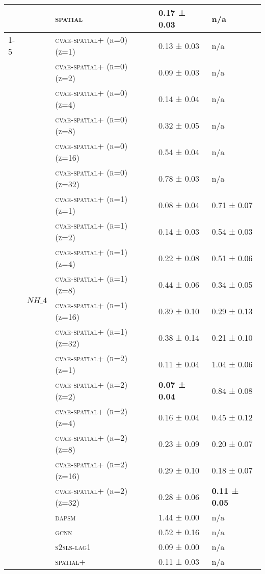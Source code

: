 \documentclass{article}
\begin{document}
\begin{table}[!tbp]
\begin{tabular}{lllll}
 &  & \textsc{spatial} & 0.17 ± { 0.03} & n/a \\
\cline{1-5} \cline{2-5}
\multirow[t]{46}{*}{$ (LC)\; SO\_{4} \;\to\; PM\_{2.5}\; (r=1) $} & \multirow[t]{23}{*}{$ NH\_{4} $} & \textsc{cvae-spatial+ (r=0) (z=1)} & 0.13 ± { 0.03} & n/a \\
 &  & \textsc{cvae-spatial+ (r=0) (z=2)} & 0.09 ± { 0.03} & n/a \\
 &  & \textsc{cvae-spatial+ (r=0) (z=4)} & 0.14 ± { 0.04} & n/a \\
 &  & \textsc{cvae-spatial+ (r=0) (z=8)} & 0.32 ± { 0.05} & n/a \\
 &  & \textsc{cvae-spatial+ (r=0) (z=16)} & 0.54 ± { 0.04} & n/a \\
 &  & \textsc{cvae-spatial+ (r=0) (z=32)} & 0.78 ± { 0.03} & n/a \\
 &  & \textsc{cvae-spatial+ (r=1) (z=1)} & 0.08 ± { 0.04} & 0.71 ± { 0.07} \\
 &  & \textsc{cvae-spatial+ (r=1) (z=2)} & 0.14 ± { 0.03} & 0.54 ± { 0.03} \\
 &  & \textsc{cvae-spatial+ (r=1) (z=4)} & 0.22 ± { 0.08} & 0.51 ± { 0.06} \\
 &  & \textsc{cvae-spatial+ (r=1) (z=8)} & 0.44 ± { 0.06} & 0.34 ± { 0.05} \\
 &  & \textsc{cvae-spatial+ (r=1) (z=16)} & 0.39 ± { 0.10} & 0.29 ± { 0.13} \\
 &  & \textsc{cvae-spatial+ (r=1) (z=32)} & 0.38 ± { 0.14} & 0.21 ± { 0.10} \\
 &  & \textsc{cvae-spatial+ (r=2) (z=1)} & 0.11 ± { 0.04} & 1.04 ± { 0.06} \\
 &  & \textsc{cvae-spatial+ (r=2) (z=2)} & \bf 0.07 ± { 0.04} & 0.84 ± { 0.08} \\
 &  & \textsc{cvae-spatial+ (r=2) (z=4)} & 0.16 ± { 0.04} & 0.45 ± { 0.12} \\
 &  & \textsc{cvae-spatial+ (r=2) (z=8)} & 0.23 ± { 0.09} & 0.20 ± { 0.07} \\
 &  & \textsc{cvae-spatial+ (r=2) (z=16)} & 0.29 ± { 0.10} & 0.18 ± { 0.07} \\
 &  & \textsc{cvae-spatial+ (r=2) (z=32)} & 0.28 ± { 0.06} & \bf 0.11 ± { 0.05} \\
 &  & \textsc{dapsm} & 1.44 ± { 0.00} & n/a \\
 &  & \textsc{gcnn} & 0.52 ± { 0.16} & n/a \\
 &  & \textsc{s2sls-lag1} & 0.09 ± { 0.00} & n/a \\
 &  & \textsc{spatial+} & 0.11 ± { 0.03} & n/a \\

\end{tabular}
\end{table}
\end{document}
